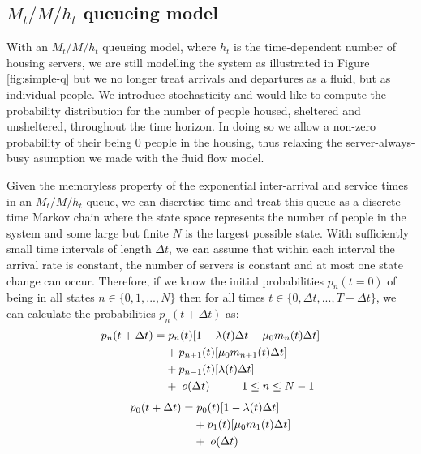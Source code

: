 \documentclass[12pt,a4paper]{article}
\begin{document}
\subsection{$M_t/M/h_t$ queueing model}
%
With an $M_t/M/h_t$ queueing model, where $h_t$ is the time-dependent number of housing servers, we are still modelling the system as illustrated in Figure \ref{fig:simple-q} but we no longer treat arrivals and departures as a fluid, but as individual people. We introduce stochasticity and would like to compute the probability distribution for the number of people housed, sheltered and unsheltered, throughout the time horizon. In doing so we allow a non-zero probability of their being $0$ people in the housing, thus relaxing the server-always-busy asumption we made with the fluid flow model.

Given the memoryless property of the exponential inter-arrival and service times in an $M_t/M/h_t$ queue, we can discretise time and treat this queue as a discrete-time Markov chain where the state space represents the number of people in the system and some large but finite $N$ is the largest possible state. With sufficiently small time intervals of length $\Delta t$, we can assume that within each interval the arrival rate is constant, the number of servers is constant and at most one state change can occur. Therefore, if we know the initial probabilities $p_n(t=0)$ of being in all states $n \in \{0,1,...,N\}$ then for all times $t \in \{0, \Delta t,...,T-\Delta t\}$, we can calculate the probabilities $p_n(t + \Delta t)$ as: 
% 
\begin{align*}
  p_n(t+\Delta t) = & \hspace{0.1cm} p_{n}(t)[1-\lambda(t)\Delta t-\mu_0 m_n(t) \Delta t] \\
                    & + p_{n+1}(t)[\mu_0 m_{n+1}(t) \Delta t] \\
                    & + p_{n-1}(t)[\lambda(t) \Delta t] \\
                    & + \hspace{0.1cm} o(\Delta t) \hspace{1cm} 1 \leq n \leq N-1
\end{align*}
% 
\begin{align*}
  p_0(t+\Delta t) = & \hspace{0.1cm} p_{0}(t)[1-\lambda(t)\Delta t] \\
                    & + p_{1}(t)[\mu_0 m_{1}(t) \Delta t] \\
                    & + \hspace{0.1cm} o(\Delta t)
\end{align*}
\end{document}
